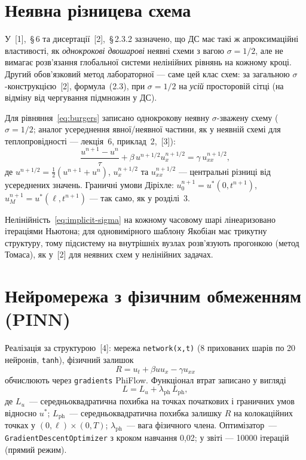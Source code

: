 \documentclass[14pt,a4paper,extarticle]{extarticle}
\newcommand{\uex}{u^*}
\begin{document}
\section{Неявна різницева схема}

У~[1],~\S\,6 та дисертації~[2],~\S\,2.3.2 зазначено, що ДС має такі ж апроксимаційні властивості, як \emph{однокрокові двошарові} неявні схеми з вагою $\sigma=1/2$, але не вимагає розв'язання глобальної системи нелінійних рівнянь на кожному кроці. Другий обов'язковий метод лабораторної --- саме цей клас схем: за загальною $\sigma$-конструкцією~[2], формула~(2.3), при $\sigma=1/2$ на \emph{усій} просторовій сітці (на відміну від чергування підмножин у ДС).

Для рівняння~\eqref{eq:burgers} записано однокрокову неявну $\sigma$-зважену схему ($\sigma=1/2$; аналог усереднення явної/неявної частини, як у неявній схемі для теплопровідності --- лекція~6, приклад~2,~[3]):
\begin{equation}
  \frac{u^{n+1}-u^n}{\tau} + \beta\, u^{n+1/2} u_x^{n+1/2}
  = \gamma\, u_{xx}^{n+1/2},
  \label{eq:implicit-sigma}
\end{equation}
де $u^{n+1/2}=\tfrac12(u^{n+1}+u^n)$, $u_x^{n+1/2}$ та $u_{xx}^{n+1/2}$ --- центральні різниці від усереднених значень. Граничні умови Діріхле: $u^{n+1}_0=\uex(0,t^{n+1})$, $u^{n+1}_M=\uex(\ell,t^{n+1})$ --- так само, як у розділі~3.

Нелінійність~\eqref{eq:implicit-sigma} на кожному часовому шарі лінеаризовано ітераціями Ньютона; для одновимірного шаблону Якобіан має трикутну структуру, тому підсистему на внутрішніх вузлах розв'язують прогонкою (метод Томаса), як у~[2] для неявних схем у нелінійних задачах.

\section{Нейромережа з фізичним обмеженням (PINN)}

Реалізація за структурою~[4]: мережа \texttt{network(x,t)} (8 прихованих шарів по 20 нейронів, \texttt{tanh}), фізичний залишок
\begin{equation}
  R = u_t + \beta u u_x - \gamma u_{xx}
\end{equation}
обчислюють через \texttt{gradients} PhiFlow. Функціонал втрат записано у вигляді
\begin{equation}
  L = L_u + \lambda_{\text{ph}}\, L_{\text{ph}},
  \label{eq:pinn-loss}
\end{equation}
де $L_u$~--- середньоквадратична похибка на точках початкових і граничних умов відносно $\uex$; $L_{\text{ph}}$~--- середньоквадратична похибка залишку $R$ на колокаційних точках у $(0,\ell)\times(0,T)$; $\lambda_{\text{ph}}$~--- вага фізичного члена.
Оптимізатор~--- \texttt{GradientDescentOptimizer} з кроком навчання 0{,}02; у звіті --- 10000 ітерацій (прямий режим).
\end{document}
